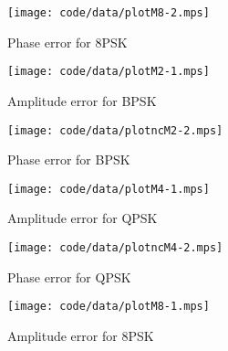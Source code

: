 \documentclass[journal]{IEEEtran}
\begin{document}
\begin{figure}[tp]
	\centering
		\texttt{[image: code/data/plotM8-2.mps]}
		\caption{Phase error for 8PSK}
		\label{fig:plotphase}
\end{figure}



 \begin{figure}[tp]
 	\centering
 		\texttt{[image: code/data/plotM2-1.mps]}
 		\caption{Amplitude error for BPSK}
 		\label{fig:plotamp}
 \end{figure}


\begin{figure}[tp]
	\centering
		\texttt{[image: code/data/plotncM2-2.mps]}
		\caption{Phase error for BPSK}
		\label{fig:plotphase}
\end{figure}


 \begin{figure}[tp]
 	\centering
 		\texttt{[image: code/data/plotM4-1.mps]}
 		\caption{Amplitude error for QPSK}
 		\label{fig:plotamp}
 \end{figure}


\begin{figure}[tp]
	\centering
		\texttt{[image: code/data/plotncM4-2.mps]}
		\caption{Phase error for QPSK}
		\label{fig:plotphase}
\end{figure}


 \begin{figure}[tp]
 	\centering
 		\texttt{[image: code/data/plotM8-1.mps]}
 		\caption{Amplitude error for 8PSK}
 		\label{fig:plotamp}
 \end{figure}
\end{document}
